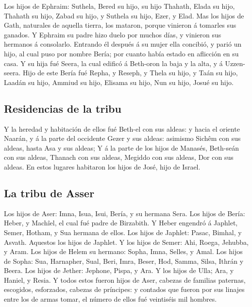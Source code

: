  Los hijos de Ephraim: Suthela, Bered su hijo, su hijo
Thahath, Elada su hijo, Thahath su hijo,  Zabad su hijo,
y Suthela su hijo, Ezer, y Elad. Mas los hijos de Gath, naturales de
aquella tierra, los mataron, porque vinieron á tomarles sus ganados.
 Y Ephraim su padre hizo duelo por muchos días, y
vinieron sus hermanos á consolarlo.  Entrando él después
á su mujer ella concibió, y parió un hijo, al cual puso por nombre
Bería; por cuanto había estado en aflicción en su casa. 
Y su hija fué Seera, la cual edificó á Beth-oron la baja y la alta, y á
Uzzen-seera.  Hijo de este Bería fué Repha, y Reseph, y
Thela su hijo, y Taán su hijo,  Laadán su hijo, Ammiud su
hijo, Elisama su hijo,  Nun su hijo, Josué su hijo.

\hypertarget{residencias-de-la-tribu}{%
\subsection{Residencias de la tribu}\label{residencias-de-la-tribu}}

 Y la heredad y habitación de ellos fué Beth-el con sus
aldeas: y hacia el oriente Naarán, y á la parte del occidente Gezer y
sus aldeas: asimismo Sichêm con sus aldeas, hasta Asa y sus aldeas;
 Y á la parte de los hijos de Manasés, Beth-seán con sus
aldeas, Thanach con sus aldeas, Megiddo con sus aldeas, Dor con sus
aldeas. En estos lugares habitaron los hijos de José, hijo de Israel.

\hypertarget{la-tribu-de-asser}{%
\subsection{La tribu de Asser}\label{la-tribu-de-asser}}

 Los hijos de Aser: Imna, Isua, Isui, Bería, y su hermana
Sera.  Los hijos de Bería: Heber, y Machîel, el cual fué
padre de Birzabith.  Y Heber engendró á Japhlet, Semer,
Hotham, y Sua hermana de ellos.  Los hijos de Japhlet:
Pasac, Bimhal, y Asvath. Aquestos los hijos de Japhlet. 
Y los hijos de Semer: Ahi, Roega, Jehubba, y Aram.  Los
hijos de Helem su hermano: Sopha, Imna, Selles, y Amal. 
Los hijos de Sopha: Sua, Harnapher, Sual, Beri, Imra, 
Beser, Hod, Samma, Silsa, Ithrán y Beera.  Los hijos de
Jether: Jephone, Pispa, y Ara.  Y los hijos de Ulla; Ara,
y Haniel, y Resia.  Y todos estos fueron hijos de Aser,
cabezas de familias paternas, escogidos, esforzados, cabezas de
príncipes: y contados que fueron por sus linajes entre los de armas
tomar, el número de ellos fué veintiséis mil hombres.

